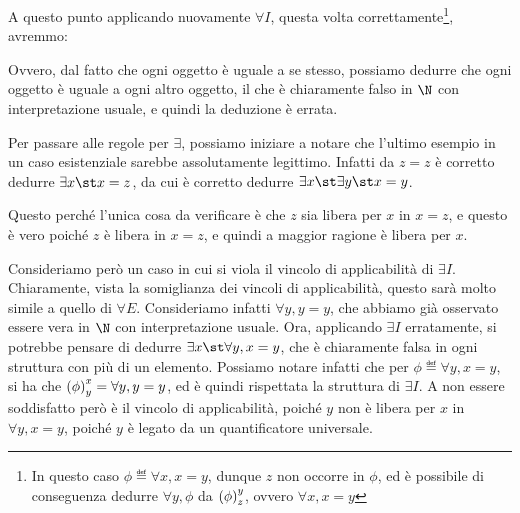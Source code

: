 A questo punto applicando nuovamente \(\forall I\), questa volta correttamente\footnote{In questo caso \(\phi \eqdef \forall x, x=y\), dunque \(z\) non occorre in \(\phi\), ed è possibile di conseguenza dedurre \(\forall y, \phi\) da \({{\left(\phi\right)}^{y}_{z}}\), ovvero \(\forall x, x=y\)}, avremmo:
\begin{prooftree}
\end{prooftree}
Ovvero, dal fatto che ogni oggetto è uguale a se stesso, possiamo dedurre che ogni oggetto è uguale a ogni altro oggetto, il che è chiaramente falso in \(\N\) con interpretazione usuale, e quindi la deduzione è errata.

Per passare alle regole per \(\exists\), possiamo iniziare a notare che l'ultimo esempio in un caso esistenziale sarebbe assolutamente legittimo.
Infatti da \(z=z\) è corretto dedurre \(\exists x\st x=z\), da cui è corretto dedurre \(\exists x\st \exists y\st x=y\).

Questo perché l'unica cosa da verificare è che \(z\) sia libera per \(x\) in \(x=z\), e questo è vero poiché \(z\) è libera in \(x=z\), e quindi a maggior ragione è libera per \(x\).

Consideriamo però un caso in cui si viola il vincolo di applicabilità di \(\exists I\). Chiaramente, vista la somiglianza dei vincoli di applicabilità, questo sarà molto simile a quello di \(\forall E\). Consideriamo infatti \(\forall y, y = y\), che abbiamo già osservato essere vera in \(\N\) con interpretazione usuale. Ora, applicando \(\exists I\) erratamente, si potrebbe pensare di dedurre \(\exists x\st\forall y, x = y\), che è chiaramente falsa in ogni struttura con più di un elemento. Possiamo notare infatti che per \(\phi \eqdef \forall y, x = y\), si ha che \({{\left(\phi\right)}^{x}_{y}} = \forall y, y = y\), ed è quindi rispettata la struttura di \(\exists I\). A non essere soddisfatto però è il vincolo di applicabilità, poiché \(y\) non è libera per \(x\) in \(\forall y, x = y\), poiché \(y\) è legato da un quantificatore universale.

